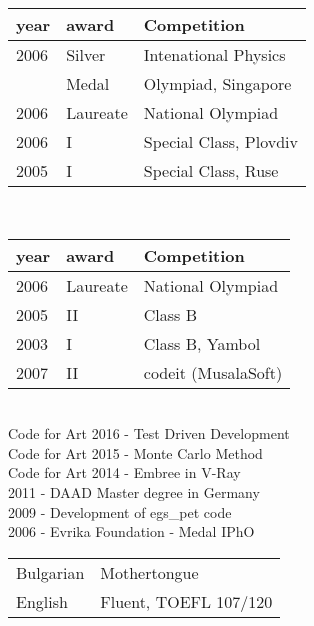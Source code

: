 \vspace{-0.4cm}
\begin{tabular}{ p{} p{} p{} }
year & award & Competition \\
\hline
2006 & Silver  & Intenational Physics \\
     & Medal   & Olympiad, Singapore  \\
2006 & Laureate& National Olympiad\\
2006 & I   & Special Class, Plovdiv  \\
2005 & I   & Special Class, Ruse     \\
\end{tabular}\\
\vspace{-0.4cm}
\begin{tabular}{ p{} p{} p{} }
year & award & Competition \\
\hline
2006 & Laureate  & National Olympiad \\
2005 & II        & Class B \\
2003 & I         & Class B, Yambol \\
2007 & II        & codeit (MusalaSoft)\\
\end{tabular}\\
\vspace{-0.4cm}
Code for Art 2016 - Test Driven Development \\
Code for Art 2015 - Monte Carlo Method \\
Code for Art 2014 - Embree in V-Ray\\
\vspace{-0.4cm}
2011 - DAAD Master degree in Germany \\
2009 - Development of egs\_pet code \\
2006 - Evrika Foundation - Medal IPhO\\
\vspace{-0.4cm}
\begin{tabular}{ l l }
Bulgarian & Mothertongue \\
English   & Fluent, TOEFL 107/120\\
\end{tabular}\\
